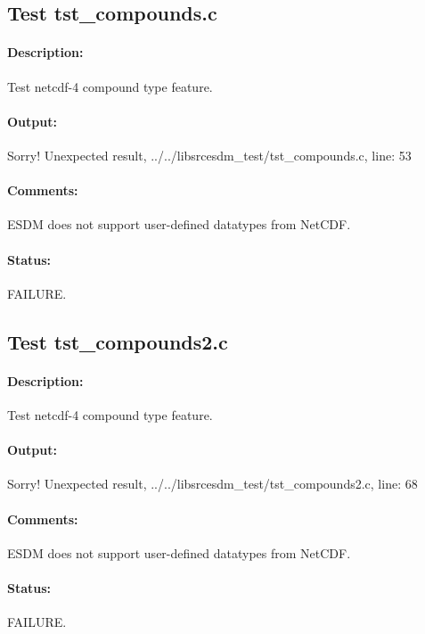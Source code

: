 \subsection{Test tst\_compounds.c}

\paragraph{Description:} Test netcdf-4 compound type feature.

\paragraph{Output:} Sorry! Unexpected result, ../../libsrcesdm\_test/tst\_compounds.c, line: 53

\paragraph{Comments:} ESDM does not support user-defined datatypes from NetCDF.

\paragraph{Status:} FAILURE.

\subsection{Test tst\_compounds2.c}

\paragraph{Description:} Test netcdf-4 compound type feature.

\paragraph{Output:} Sorry! Unexpected result, ../../libsrcesdm\_test/tst\_compounds2.c, line: 68

\paragraph{Comments:} ESDM does not support user-defined datatypes from NetCDF.

\paragraph{Status:} FAILURE.

